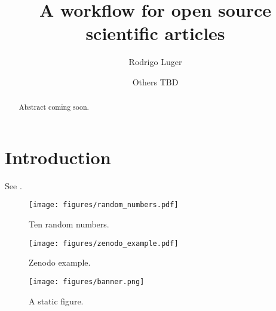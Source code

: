 \documentclass[twocolumn]{aastex631}
\begin{document}
\title{A workflow for open source scientific articles}

\author[0000-0002-0296-3826]{Rodrigo Luger}
\author{Others TBD}

\begin{abstract}
    Abstract coming soon.
\end{abstract}

\section{Introduction}
\label{sec:intro}

See \citet{Luger2021}.

\begin{figure}[ht!]
    \begin{centering}
        \texttt{[image: figures/random\_numbers.pdf]}
        \caption{Ten random numbers.}
        \label{fig:random_numbers}
    \end{centering}
\end{figure}

\begin{figure}[ht!]
    \begin{centering}
        \texttt{[image: figures/zenodo\_example.pdf]}
        \caption{Zenodo example.}
        \label{fig:zenodo_example}
    \end{centering}
\end{figure}

\begin{figure}[th!]
    \begin{centering}
        \texttt{[image: figures/banner.png]}
        \caption{A static figure.}
        \label{fig:banner}
    \end{centering}
\end{figure}


\end{document}
